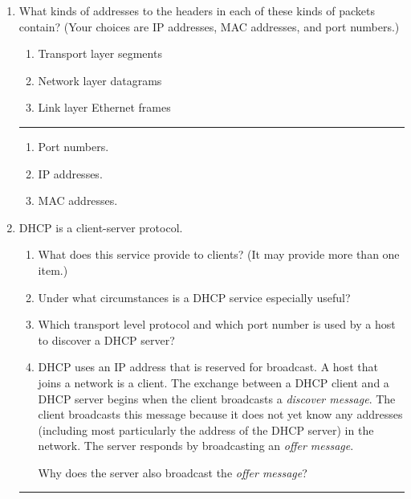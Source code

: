 \documentclass[twoside]{article}
\newenvironment{answer}
  {\vspace*{0.2cm} \rule{12cm}{0.04cm} \vspace*{0.2cm}}
  {\vspace*{0.2cm}}
\begin{document}
\begin{enumerate}
\begin{answer}
    \end{answer}

  \item What kinds of addresses to the headers in each of these kinds
      of packets contain? (Your choices are IP addresses, MAC addresses,
      and port numbers.)
  \begin{enumerate}
    \item Transport layer segments
    \item Network layer datagrams
    \item Link layer Ethernet frames
    \end{enumerate}

  \begin{answer}

  \begin{enumerate}
    \item Port numbers.
    \item IP addresses.
    \item MAC addresses.
    \end{enumerate}

    \end{answer}

  \item DHCP is a client-server protocol.
  \begin{enumerate}
    \item What does this service provide to clients? (It may provide more than one item.) 
    \item Under what circumstances is a DHCP service especially useful?
    \item Which transport level protocol and which port number is used by
      a host to discover a DHCP server?
    \item DHCP uses an IP address that is reserved for broadcast. 
      A host that joins a network is a client.
      The exchange between a DHCP client and a DHCP server begins when
      the client broadcasts a \emph{discover message}.
      The client broadcasts this message because it does not yet know
      any addresses (including most particularly the address of the DHCP
      server) in the network.
      The server responds by broadcasting an \emph{offer message}.

      Why does the server also broadcast the \emph{offer message}?

    \end{enumerate}

  \begin{answer}


\end{answer}
\end{enumerate}
\end{document}
